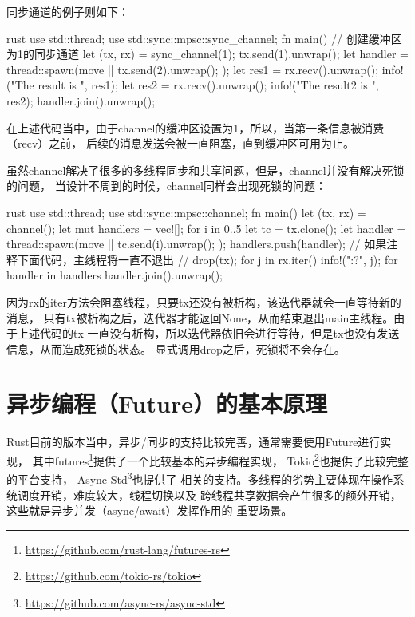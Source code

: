 同步通道的例子则如下：
\begin{code-block}{rust}
use std::thread;
use std::sync::mpsc::sync_channel;
fn main() {
    // 创建缓冲区为1的同步通道
    let (tx, rx) = sync_channel(1);
    tx.send(1).unwrap();
    let handler = thread::spawn(move || {
        tx.send(2).unwrap();
    });
    let res1 = rx.recv().unwrap();
    info!("The result is {}", res1);
    let res2 = rx.recv().unwrap();
    info!("The result2 is {}", res2);
    handler.join().unwrap();
}
\end{code-block}
在上述代码当中，由于channel的缓冲区设置为1，所以，当第一条信息被消费（recv）之前，
后续的消息发送会被一直阻塞，直到缓冲区可用为止。

虽然channel解决了很多的多线程同步和共享问题，但是，channel并没有解决死锁的问题，
当设计不周到的时候，channel同样会出现死锁的问题：
\begin{code-block}{rust}
use std::thread;
use std::sync::mpsc::channel;
fn main() {
    let (tx, rx) = channel();
    let mut handlers = vec![];
    for i in 0..5 {
        let tc = tx.clone();
        let handler = thread::spawn(move || {
            tc.send(i).unwrap();
        });
        handlers.push(handler);
    }
    // 如果注释下面代码，主线程将一直不退出
    // drop(tx);
    for j in rx.iter() {
        info!("{:?}", j);
    }
    for handler in handlers {
        handler.join().unwrap();
    }
}
\end{code-block}
因为rx的iter方法会阻塞线程，只要tx还没有被析构，该迭代器就会一直等待新的消息，
只有tx被析构之后，迭代器才能返回None，从而结束退出main主线程。由于上述代码的tx
一直没有析构，所以迭代器依旧会进行等待，但是tx也没有发送信息，从而造成死锁的状态。
显式调用drop之后，死锁将不会存在。

\section{异步编程（Future）的基本原理}
Rust目前的版本当中，异步/同步的支持比较完善，通常需要使用Future进行实现，
其中futures\footnote{\url{https://github.com/rust-lang/futures-rs}}提供了一个比较基本的异步编程实现，
Tokio\footnote{\url{https://github.com/tokio-rs/tokio}}也提供了比较完整的平台支持，
Async-Std\footnote{\url{https://github.com/async-rs/async-std}}也提供了
相关的支持。多线程的劣势主要体现在操作系统调度开销，难度较大，线程切换以及
跨线程共享数据会产生很多的额外开销，这些就是异步并发（async/await）发挥作用的
重要场景。

